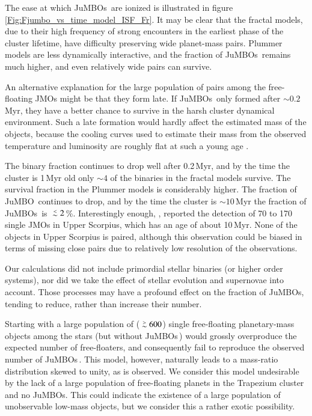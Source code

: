 \documentclass[submission,phys]{lib/SciPost}
\def\apgt{\ {\raise-.5ex\hbox{$\buildrel>\over\sim$}}\ }
\def\aplt{\ {\raise-.5ex\hbox{$\buildrel<\over\sim$}}\ }
\newcommand{\jumbo}{\mbox{JuMBO}}
\newcommand{\jumbos}{\mbox{JuMBOs}}
\begin{document}
The ease at which \jumbos\, are ionized is illustrated in
figure\,\ref{Fig:Fjumbo_vs_time_model_ISF_Fr}. It may be clear that
the fractal models, due to their high frequency of strong encounters
in the earliest phase of the cluster lifetime, have difficulty preserving wide
planet-mass pairs. Plummer models are less dynamically interactive,
and the fraction of \jumbos\, remains much higher, and even relatively
wide pairs can survive.

An alternative explanation for the large population of pairs among the
free-floating JMOs might be that they form late.  If \jumbos\, only
formed after $\sim 0.2$\,Myr, they have a better chance to survive in
the harsh cluster dynamical environment.  Such a late formation would
hardly affect the estimated mass of the objects, because the cooling
curves used to estimate their mass from the observed temperature and
luminosity are roughly flat at such a young age
\cite{2000MNRAS.314..858L}.

The binary fraction continues to drop well after 0.2\,Myr, and by the
time the cluster is 1\,Myr old only $\sim 4$ of the binaries in the
fractal models survive. The survival fraction in the Plummer models is
considerably higher. The fraction of \jumbo\, continues to drop, and
by the time the cluster is $\sim 10$\,Myr the fraction of \jumbos\ is
$\aplt 2$\,\%.  Interestingly enough, \cite{2022NatAs...6...89M},
reported the detection of 70 to 170 single JMOs in Upper Scorpius,
which has an age of about 10\,Myr.  None of the objects in Upper
Scorpius is paired, although this observation could be biased in terms
of missing close pairs due to relatively low resolution of the
observations.  

Our calculations did not include primordial stellar binaries (or
higher order systems), nor did we take the effect of stellar evolution
and supernovae into account. Those processes may have a profound
effect on the fraction of \jumbos, tending to reduce, rather than
increase their number.

Starting with a large population of ($\apgt 600$) single free-floating
planetary-mass objects among the stars (but without \jumbos\,) would
grossly overproduce the expected number of free-floaters, and
consequently fail to reproduce the observed number of \jumbos\,.  This
model, however, naturally leads to a mass-ratio distribution skewed to
unity, as is observed. We consider this model undesirable by the lack
of a large population of free-floating planets in the Trapezium
cluster and no \jumbos. This could indicate the existence of a large
population of unobservable low-mass objects, but we consider this a
rather exotic possibility.
\end{document}
